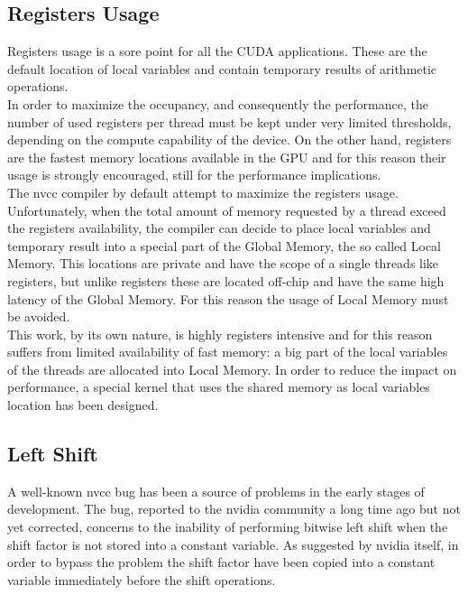 \subsection{Registers Usage}
Registers usage is a sore point for all the CUDA applications. These are the default location of local variables and contain temporary results of arithmetic operations.\\
In order to maximize the occupancy, and consequently the performance, the number of used registers per thread must be kept under very limited thresholds, depending on the compute capability of the device. On the other hand, registers are the fastest memory locations available in the GPU and for this reason their usage is strongly encouraged, still for the performance implications.\\
The nvcc compiler by default attempt to maximize the registers usage. Unfortunately, when the total amount of memory requested by a thread exceed the registers availability, the compiler can decide to place local variables and temporary result into a special part of the Global Memory, the so called Local Memory. This locations are private and have the scope of a single threads like registers, but unlike registers these are located off-chip and have the same high latency of the Global Memory. For this reason the usage of Local Memory must be avoided.\\
This work, by its own nature, is highly registers intensive and for this reason suffers from limited availability of fast memory: a big part of the local variables of the threads are allocated into Local Memory. In order to reduce the impact on performance, a special kernel that uses the shared memory as local variables location has been designed.

\subsection{Left Shift}
A well-known nvcc bug has been a source of problems in the early stages of development. The bug, reported to the nvidia community a long time ago but not yet corrected, concerns to the inability of performing bitwise left shift when the shift factor is not stored into a constant variable. As suggested by nvidia itself, in order to bypass the problem the shift factor have been copied into a constant variable immediately before the shift operations.
